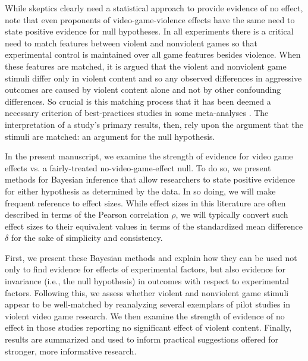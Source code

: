 \documentclass[man]{apa6}
\begin{document}
While skeptics clearly need a statistical approach to provide evidence of no effect, note that even proponents of video-game-violence effects have the same need to state positive evidence for null hypotheses.  In all experiments there is a critical need to match features between violent and nonviolent games so that experimental control is maintained over all game features besides violence.  When these features are matched, it is argued that the violent and nonviolent game stimuli differ only in violent content and so any observed differences in aggressive outcomes are caused by violent content alone and not by other confounding differences.  
So crucial is this matching process that it has been deemed a necessary criterion of best-practices studies in some meta-analyses \citep{Anderson:etal:2010}. The interpretation of a study's primary results, then, rely upon the argument that the stimuli are matched: an argument for the null hypothesis.  

In the present manuscript, we examine the strength of evidence for video game effects vs. a fairly-treated no-video-game-effect null.  To do so, we present methods for Bayesian inference that allow researchers to state positive evidence for either hypothesis as determined by the data. In so doing, we will make frequent reference to effect sizes. While effect sizes in this literature are often described in terms of the Pearson correlation $\rho$, we will typically convert such effect sizes to their equivalent values in terms of the standardized mean difference $\delta$ for the sake of simplicity and consistency.

First, we present these Bayesian methods and explain how they can be used not only to find evidence for effects of experimental factors, but also evidence for invariance (i.e., the null hypothesis) in outcomes with respect to experimental factors. Following this, we assess whether violent and nonviolent game stimuli appear to be well-matched by reanalyzing several exemplars of pilot studies in violent video game research.  We then examine the strength of evidence of no effect in those studies reporting no significant effect of violent content.  Finally, results are summarized and used to inform practical suggestions offered for stronger, more informative research. 
\end{document}
